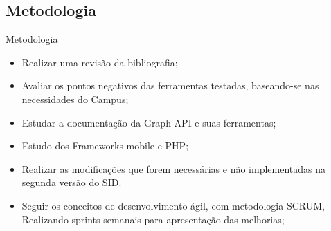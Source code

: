 \documentclass{aula-ifb}
\begin{document}
\subsection{Metodologia}
\begin{frame}{Metodologia}
	\begin{itemize}
   		\item Realizar uma revisão da bibliografia;
   		\vspace{10px}
   		\item Avaliar os pontos negativos das ferramentas testadas, baseando-se nas necessidades do Campus;
   		\vspace{10px}
   		\item Estudar a documentação da Graph API e suas ferramentas;
   		\vspace{10px}
   		\item Estudo dos Frameworks mobile e PHP;
   		\vspace{10px}
   		\item Realizar as modificações que forem necessárias e não implementadas na segunda versão do SID.
   		\vspace{10px}
   		\item Seguir os conceitos de desenvolvimento ágil, com metodologia SCRUM, Realizando sprints semanais para apresentação das melhorias;
	\end{itemize}
\end{frame}
\end{document}
